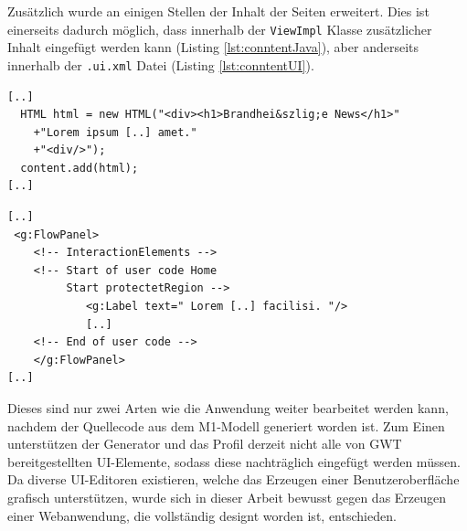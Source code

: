 Zusätzlich wurde an einigen Stellen der Inhalt der Seiten erweitert. Dies ist
einerseits dadurch möglich, dass innerhalb der \texttt{ViewImpl} Klasse
zusätzlicher Inhalt eingefügt werden kann (Listing \ref{lst:conntentJava}), aber
anderseits innerhalb der \texttt{.ui.xml} Datei (Listing \ref{lst:conntentUI}).

\lstset{language=gwt}
\begin{lstlisting}[caption={Einfügen von Inhalten auf einer Seite durch
Veränderungen am Java-Code},
label={lst:conntentJava}] 
[..] 
  HTML html = new HTML("<div><h1>Brandhei&szlig;e News</h1>"
	+"Lorem ipsum [..] amet."
	+"<div/>");
  content.add(html);
[..]
\end{lstlisting}
\lstset{language=gwt}
\begin{lstlisting}[caption={Einfügen von Inhalten auf einer Seite durch
Veränderungen am ui.xml-Datei},
label={lst:conntentUI}] 
[..] 
 <g:FlowPanel>
	<!-- InteractionElements -->
	<!-- Start of user code Home 
	     Start protectetRegion -->
			<g:Label text=" Lorem [..] facilisi. "/>
			[..]		
	<!-- End of user code -->
	</g:FlowPanel>
[..]
\end{lstlisting}

Dieses sind nur zwei Arten wie die Anwendung weiter bearbeitet werden kann,
nachdem der Quellecode aus dem M1-Modell generiert worden ist. Zum Einen
unterstützen der Generator und das Profil derzeit nicht alle von GWT
bereitgestellten UI-Elemente, sodass diese nachträglich eingefügt werden
müssen. Da diverse UI-Editoren existieren, welche das Erzeugen einer
Benutzeroberfläche grafisch unterstützen, wurde sich in dieser Arbeit bewusst
gegen das Erzeugen einer Webanwendung, die vollständig designt worden ist,
entschieden. 
